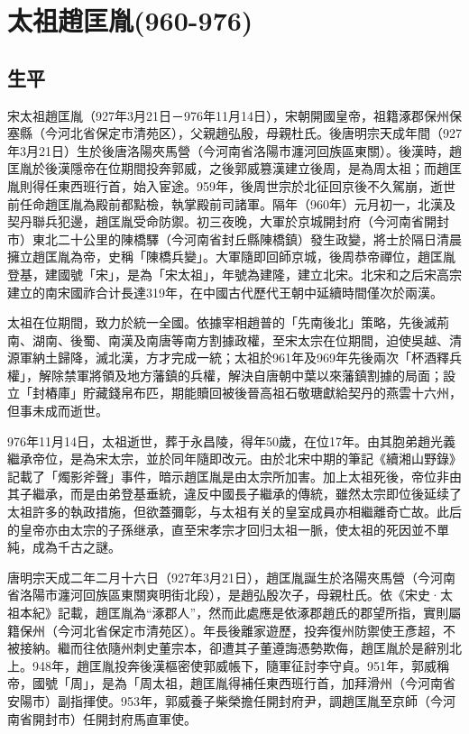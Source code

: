 
\section{太祖趙匡胤\tiny(960-976)}

\subsection{生平}

宋太祖趙匡胤（927年3月21日－976年11月14日），宋朝開國皇帝，祖籍涿郡保州保塞縣（今河北省保定市清苑区），父親趙弘殷，母親杜氏。後唐明宗天成年間（927年3月21日）生於後唐洛陽夾馬營（今河南省洛陽市瀍河回族區東關）。後漢時，趙匡胤於後漢隱帝在位期間投奔郭威，之後郭威篡漢建立後周，是為周太祖；而趙匡胤則得任東西班行首，始入宦途。959年，後周世宗於北征回京後不久駕崩，逝世前任命趙匡胤為殿前都點檢，執掌殿前司諸軍。隔年（960年）元月初一，北漢及契丹聯兵犯邊，趙匡胤受命防禦。初三夜晚，大軍於京城開封府（今河南省開封市）東北二十公里的陳橋驛（今河南省封丘縣陳橋鎮）發生政變，將士於隔日清晨擁立趙匡胤為帝，史稱「陳橋兵變」。大軍隨即回師京城，後周恭帝禪位，趙匡胤登基，建國號「宋」，是為「宋太祖」，年號為建隆，建立北宋。北宋和之后宋高宗建立的南宋國祚合计長達319年，在中國古代歷代王朝中延續時間僅次於兩漢。

太祖在位期間，致力於統一全國。依據宰相趙普的「先南後北」策略，先後滅荊南、湖南、後蜀、南漢及南唐等南方割據政權，至宋太宗在位期間，迫使吳越、清源軍納土歸降，滅北漢，方才完成一統；太祖於961年及969年先後兩次「杯酒釋兵權」，解除禁軍將領及地方藩鎮的兵權，解決自唐朝中葉以來藩鎮割據的局面；設立「封樁庫」貯藏錢帛布匹，期能贖回被後晉高祖石敬瑭獻給契丹的燕雲十六州，但事未成而逝世。

976年11月14日，太祖逝世，葬于永昌陵，得年50歲，在位17年。由其胞弟趙光義繼承帝位，是為宋太宗，並於同年隨即改元。由於北宋中期的筆記《續湘山野錄》記載了「燭影斧聲」事件，暗示趙匡胤是由太宗所加害。加上太祖死後，帝位非由其子繼承，而是由弟登基垂統，違反中國長子繼承的傳統，雖然太宗即位後延续了太祖許多的執政措施，但欲蓋彌彰，与太祖有关的皇室成員亦相繼離奇亡故。此后的皇帝亦由太宗的子孫继承，直至宋孝宗才回归太祖一脈，使太祖的死因並不單純，成為千古之謎。

唐明宗天成二年二月十六日（927年3月21日），趙匡胤誕生於洛陽夾馬營（今河南省洛陽市瀍河回族區東關爽明街北段），是趙弘殷次子，母親杜氏。依《宋史·太祖本紀》記載，趙匡胤為“涿郡人”，然而此處應是依涿郡趙氏的郡望所指，實則屬籍保州（今河北省保定市清苑区）。年長後離家遊歷，投奔復州防禦使王彥超，不被接納。繼而往依隨州刺史董宗本，卻遭其子董遵誨憑勢欺侮，趙匡胤於是辭別北上。948年，趙匡胤投奔後漢樞密使郭威帳下，隨軍征討李守貞。951年，郭威稱帝，國號「周」，是為「周太祖，趙匡胤得補任東西班行首，加拜滑州（今河南省安陽市）副指揮使。953年，郭威養子柴榮擔任開封府尹，調趙匡胤至京師（今河南省開封市）任開封府馬直軍使。

